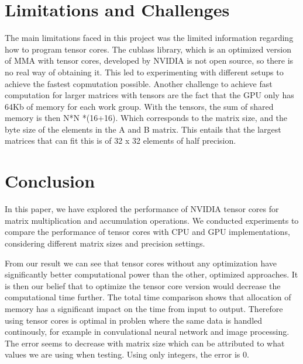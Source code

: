 \documentclass[conference]{IEEEtran}
\begin{document}
  \section{Limitations and Challenges}\label{sec:limitations-challenges}
  The main limitations faced in this project was the limited information regarding how to program tensor cores.
  The cublass library, which is an optimized version of MMA with tensor cores, developed by NVIDIA is not open source,
  so there is no real way of obtaining it. This led to experimenting with different setups to achieve the fastest copmutation possible.
  Another challenge to achieve fast computation for larger matrices with tensors are the fact that the GPU 
  only has 64Kb of memory for each work group. With the tensors, the sum of shared memory is then N*N *(16+16).
  Which corresponds to the matrix size, and the byte size of the elements in the A and B matrix. This entails that the 
  largest matrices that can fit this is of 32 x 32 elements of half precision.


  \section{Conclusion}\label{sec:conclusion}
  
  In this paper, we have explored the performance of NVIDIA tensor cores for matrix multiplication and accumulation operations. 
  We conducted experiments to compare the performance of tensor cores with CPU and GPU implementations, 
  considering different matrix sizes and precision settings.

  From our result we can see that tensor cores without any optimization have significantly better computational power
  than the other, optimized approaches. It is then our belief that to optimize the tensor core version would 
  decrease the computational time further. The total time comparison shows that allocation of memory has a significant
  impact on the time from input to output. Therefore using tensor cores is optimal in problen where the same data is
  handled continously, for example in convulational neural network and image processing. The error seems to decrease
  with matrix size which can be attributed to what values we are using when testing. Using only integers, the error is 0.

  



\end{document}
